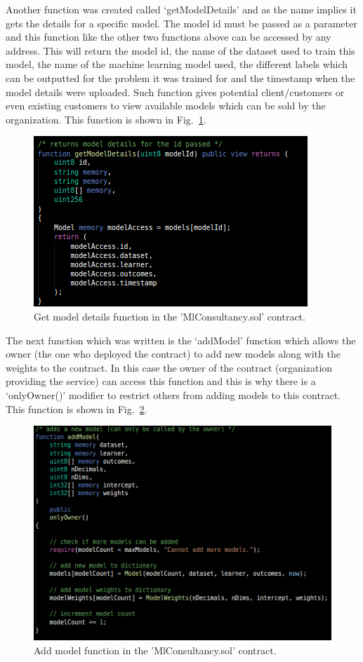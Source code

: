 \noindent
Another function was created called ‘getModelDetails’ and as the name implies it gets the details for a specific model. The model id must be passed as a parameter and this function like the other two functions above can be accessed by any address. This will return the model id, the name of the dataset used to train this model, the name of the machine learning model used, the different labels which can be outputted for the problem it was trained for and the timestamp when the model details were uploaded. Such function gives potential client/customers or even existing customers to view available models which can be sold by the organization. This function is shown in Fig.~\ref{fig:model_sol_4}. 

\begin{figure}[H]
\centering
  \includegraphics[scale = .75]{imgs/model_sol_4.png}
  \caption{Get model details function in the 'MlConsultancy.sol' contract.}
  \label{fig:model_sol_4}
\end{figure}

\noindent
The next function which was written is the ‘addModel’ function which allows the owner (the one who deployed the contract) to add new models along with the weights to the contract. In this case the owner of the contract (organization providing the service) can access this function and this is why there is a ‘onlyOwner()’ modifier to restrict others from adding models to this contract. This function is shown in Fig.~\ref{fig:model_sol_5}. 

\begin{figure}[H]
\centering
  \includegraphics[scale = .75]{imgs/model_sol_5.png}
  \caption{Add model function in the 'MlConsultancy.sol' contract.}
  \label{fig:model_sol_5}
\end{figure}

